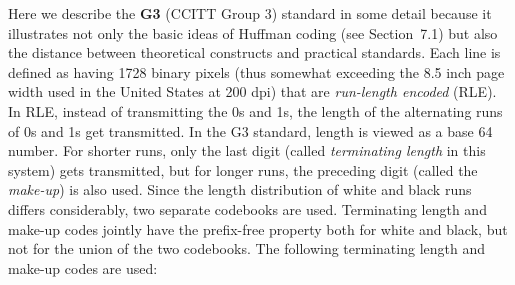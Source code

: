 Here we describe the {\bf G3} (CCITT Group 3) standard in some detail because
it illustrates not only the basic ideas of Huffman coding (see Section~7.1)
but also the distance between theoretical constructs and practical standards.
 Each line is defined as having 1728 binary pixels (thus
somewhat exceeding the 8.5 inch page width used in the United States at 200
dpi) that are {\it run-length encoded} (RLE).
In RLE, instead of transmitting the 0s and 1s, the length of the alternating
runs of 0s and 1s get transmitted. In the G3 standard, length is viewed as a
base 64 number. For shorter runs, only the last digit (called {\it terminating
  length} in this system) gets transmitted, but for longer runs, the preceding
digit (called the {\it make-up}) is also used. Since the length distribution
of white and black runs differs considerably, two separate codebooks are
used. Terminating length and make-up codes jointly have the prefix-free
property both for white and black, but not for the union of the two codebooks.
The following terminating length and make-up codes are used:

